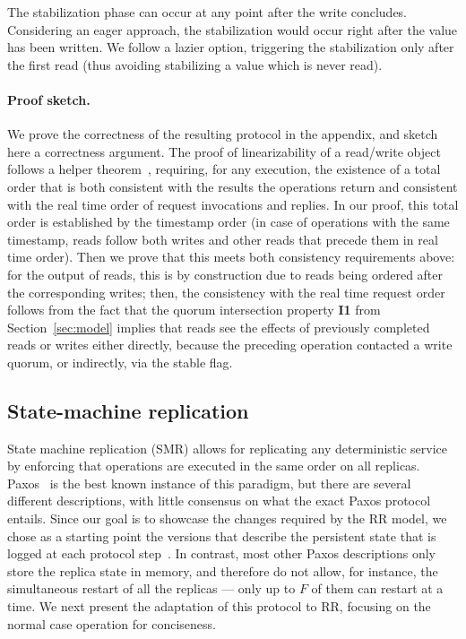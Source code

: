The stabilization phase can
occur at any point after the write concludes. Considering an eager
approach, the stabilization would occur right after the value has been
written. We follow a lazier option, triggering the stabilization only
after the first read (thus avoiding stabilizing a value which is never
read).


\paragraph{Proof sketch.}
We prove the correctness of the resulting protocol in the
appendix, and sketch here a correctness argument. The proof of
linearizability of a read/write object follows a helper
theorem~\cite{nancy-book}, requiring, for any execution, the
existence of a total order that is both consistent with the
results the operations return and consistent with the real time
order of request invocations and replies. In our proof, this
total order is established by the timestamp order (in case of
operations with the same timestamp, reads follow both writes and
other reads that precede them in real time order).  Then we prove
that this meets both consistency requirements above: for the
output of reads, this is by construction due to reads being
ordered after the corresponding writes; then,
the consistency with the real time request order follows from the
fact that the quorum intersection property \textbf{I1} from
Section~\ref{sec:model} implies that reads see the effects of
previously completed reads or writes either directly, because the
preceding operation contacted a write quorum, or indirectly, via
the stable flag.


\subsection{State-machine replication}\label{ssec:paxos}

State machine replication (SMR) allows for replicating any
deterministic service by enforcing that operations are executed in the
same order on all replicas. Paxos~\cite{paxos} is the best known
instance of this paradigm, but there are several different
descriptions, with little consensus on what the exact Paxos protocol
entails.  Since our goal is to showcase the changes required by the
\ac{RR} model, we chose as a starting point the versions that
describe the persistent state that is logged at each protocol
step~\cite{paxos_builders,paxos_engineering}. In contrast, most other
Paxos descriptions only store the replica state in memory, and therefore
do not allow, for instance, the simultaneous restart of all the
replicas --- only up to $F$ of them can restart at a time. We next
present the adaptation of this protocol to \ac{RR}, focusing on
the normal case operation for conciseness.

